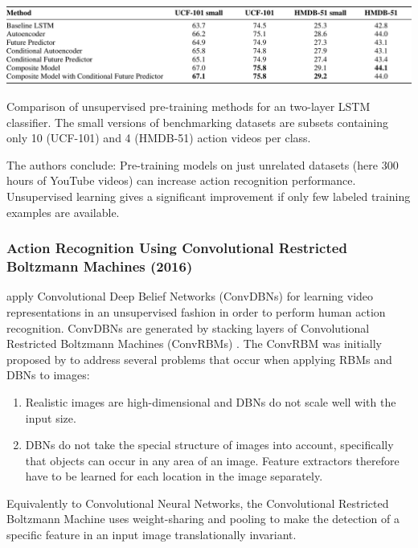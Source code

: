 \begin{table}
    \centering
    \includegraphics[width=\textwidth]{img_deep/unsupervisedlstms_results}
    \caption{Comparison of unsupervised pre-training methods for an two-layer LSTM classifier. The small versions of benchmarking datasets are subsets containing only 10 (UCF-101) and 4 (HMDB-51) action videos per class. \cite{srivastava_unsupervised_2015}}
    \label{tab:unsupervisedlstms_results}
\end{table}

The authors conclude: Pre-training models on just unrelated datasets (here 300 hours of YouTube videos) can increase action recognition performance.
Unsupervised learning gives a significant improvement if only few labeled training examples are available.


\subsubsection{Action Recognition Using Convolutional Restricted Boltzmann Machines (2016)}
\textcite{palasek_action_2016} apply Convolutional Deep Belief Networks (ConvDBNs) for learning video representations in an unsupervised fashion in order to perform human action recognition.
ConvDBNs are generated by stacking layers of Convolutional Restricted Boltzmann Machines (ConvRBMs) \cite{lee_convolutional_2009-1}.
The ConvRBM was initially proposed by \textcite{lee_convolutional_2009-1} to address several problems that occur when applying RBMs and DBNs to images:

\begin{enumerate}
    \item Realistic images are high-dimensional and DBNs do not scale well with the input size. \cite{lee_convolutional_2009-1} 
    \item DBNs do not take the special structure of images into account, specifically that objects can occur in any area of an image. Feature extractors therefore have to be learned for each location in the image separately. \cite{lee_convolutional_2009-1} 
\end{enumerate}

Equivalently to Convolutional Neural Networks, the Convolutional Restricted Boltzmann Machine uses weight-sharing and pooling to make the detection of a specific feature in an input image translationally invariant.

